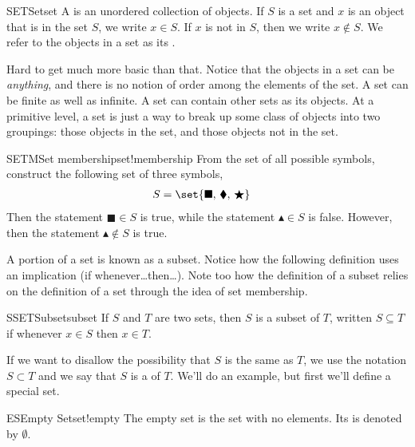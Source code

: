 %
\begin{definition}{SET}{Set}{set}
A  is an unordered collection of objects.  If $S$ is a set and $x$ is an object that is in the set $S$, we write $x\in S$.  If $x$ is not in $S$, then we write $x\not\in S$.  We refer to the objects in a set as its .
\end{definition}
%
Hard to get much more basic than that.   Notice that the objects in a set can be {\em anything}, and there is no notion of order among the elements of the set.  A set can be finite as well as infinite.  A set can contain other sets as its objects.  At a primitive level, a set is just a way to break up some class of objects into two groupings:  those objects in the set, and those objects not in the set.
%
\begin{example}{SETM}{Set membership}{set!membership}
From the set of all possible symbols, construct the following set of three symbols,
%
\begin{align*}
S&=\set{\blacksquare,\,\blacklozenge,\,\bigstar}
\end{align*}
%
Then the statement $\blacksquare\in S$ is true, while the statement $\blacktriangle\in S$ is false.  However, then the statement $\blacktriangle\not\in S$ is true.
\end{example}
%
A portion of a set is known as a subset.  Notice how the following definition uses an implication (if whenever\dots then\dots).  Note too how the definition of a subset relies on the definition of a set through the idea of set membership.
%
\begin{definition}{SSET}{Subset}{subset}
If $S$ and $T$ are two sets, then $S$ is a subset of $T$, written $S\subseteq T$ if whenever $x\in S$ then $x\in T$.
\end{definition}
%
If we want to disallow the possibility that $S$ is the same as $T$, we use the notation $S\subset T$ and we say that $S$ is a  of $T$.   We'll do an example, but first we'll define a special set.
%
%
\begin{definition}{ES}{Empty Set}{set!empty}
The empty set is the set with no elements.  Its is denoted by $\emptyset$.
\end{definition}
